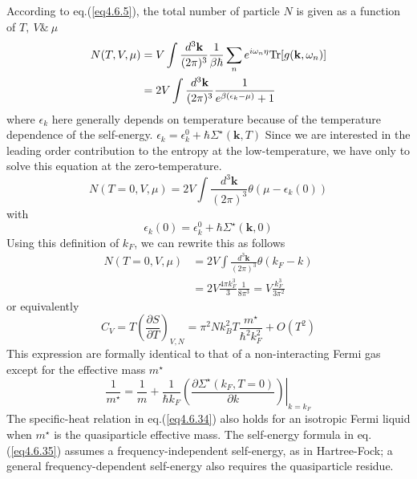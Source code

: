  According to eq.(\ref{eq4.6.5}), the total number of particle $N$ is given as a function of $T,\ V\&\ \mu$
\[
\begin{aligned}
N(T,V,\mu)&=V\int \frac{d^3\mathbf{k}}{(2\pi)^3} \frac{1}{\beta\hbar} \sum_n e^{i\omega_n \eta} \text{Tr}[g(\mathbf{k},\omega_n)]\\
&=2V\int \frac{d^3\mathbf{k}}{(2\pi)^3}\frac{1}{e^{\beta(\epsilon_k-\mu)}+1}
\end{aligned}
\]
where $\epsilon_k$ here generally depends on temperature because of the temperature dependence of the self-energy. $\epsilon_k=\epsilon_k^0+\hbar \Sigma^\star (\mathbf{k},T)$
 Since we are interested in the leading order contribution to the entropy at the low-temperature, we have only to solve this equation at the zero-temperature.
\begin{equation}
N(T=0,V,\mu)=2V \int \frac{d^3\mathbf{k}}{(2\pi)^3} \theta(\mu-\epsilon_k(0))
\end{equation} 
with
\begin{equation}\tag{4.6.31'}
\epsilon_k(0)=\epsilon_k^0+\hbar \Sigma^\star (\mathbf{k},0)
\end{equation}
 Using this definition of $k_F$, we can rewrite this as follows
\begin{equation}
\begin{aligned}
N(T=0,V,\mu)&=2V \int \frac{d^3\mathbf{k}}{(2\pi)^3} \theta(k_F-k)\\
&=2V\frac{4\pi k_F^3}{3} \frac{1}{8\pi^3}=V\frac{k_F^3}{3\pi^2}
\end{aligned}
\end{equation}
or equivalently
\begin{equation}\label{eq4.6.34}
C_V=T\left(\frac{\partial S}{\partial T}\right)_{V,N}=\pi^2 N k_B^2 T \frac{m^\star}{\hbar^2 k_F^2} +O(T^2)
\end{equation}
 This expression are formally identical to that of a non-interacting Fermi gas except for the effective mass $m^\star$
\begin{equation}\label{eq4.6.35}
\frac{1}{m^\star} =\frac{1}{m} +\frac{1}{\hbar k_F}\left. \left( \frac{\partial \Sigma^\star(k_F,T=0)}{\partial k} \right)\right|_{k=k_F}
\end{equation}
 The specific-heat relation in eq.(\ref{eq4.6.34}) also holds for an isotropic Fermi liquid when $m^\star$ is the quasiparticle effective mass. The self-energy formula in eq.(\ref{eq4.6.35}) assumes a frequency-independent self-energy, as in Hartree-Fock; a general frequency-dependent self-energy also requires the quasiparticle residue.







